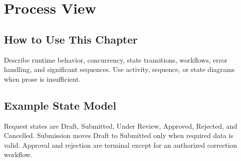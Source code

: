 \chapter{Process View}
\section{How to Use This Chapter}
Describe runtime behavior, concurrency, state transitions, workflows, error handling, and significant sequences. Use activity, sequence, or state diagrams when prose is insufficient.
\section{Example State Model}
Request states are Draft, Submitted, Under Review, Approved, Rejected, and Cancelled. Submission moves Draft to Submitted only when required data is valid. Approval and rejection are terminal except for an authorized correction workflow.
